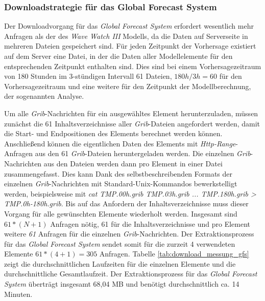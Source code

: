 \subsubsection{Downloadstrategie für das Global Forecast System}
Der Downloadvorgang für das \textit{Global Forecast System} erfordert
wesentlich mehr Anfragen als der des \textit{Wave Watch III} Modells,
da die Daten auf Serverseite in mehreren Dateien gespeichert sind. Für
jeden Zeitpunkt der Vorhersage existiert auf dem Server eine Datei, in
der die Daten aller Modellelemente für den entsprechenden Zeitpunkt
enthalten sind. Dies sind bei einem Vorhersagezeitraum von 180 Stunden
im 3-stündigen Intervall 61 Dateien, $180h / 3h = 60$ für den
Vorhersagezeitraum und eine weitere für den Zeitpunkt der
Modellberechnung, der sogenannten Analyse.

Um alle \textit{Grib}-Nachrichten für ein ausgewähltes Element
herunterzuladen, müssen zunächst die 61 Inhaltsverzeichnisse aller
\textit{Grib}-Dateien angefordert werden, damit die Start- und
Endpositionen des Elements berechnet werden können. Anschließend
können die eigentlichen Daten des Elements mit
\textit{Http-Range}-Anfragen aus den 61 \textit{Grib}-Dateien
heruntergeladen werden. Die einzelnen \textit{Grib}-Nachrichten aus
den Dateien werden dann pro Element in einer Datei
zusammengefasst. Dies kann Dank des selbstbeschreibenden Formats der
einzelnen \textit{Grib}-Nachrichten mit Standard-Unix-Kommandos
bewerkstelligt werden, beispielsweise mit \textit{cat TMP.00h.grib
  TMP.03h.grib ... TMP.180h.grib > TMP.0h-180h.grib}. Bis auf das
Anfordern der Inhaltsverzeichnisse muss dieser Vorgang für alle
gewünschten Elemente wiederholt werden. Insgesamt sind $ 61 * (N+1) $
Anfragen nötig, 61 für die Inhaltsverzeichnisse und pro Element
weitere \textit{61} Anfragen für die einzelnen
\textit{Grib}-Nachrichten. Der Extraktionsprozess für das
\textit{Global Forecast System} sendet somit für die zurzeit 4
verwendeten Elemente $ 61 * (4+1) = 305$ Anfragen. Tabelle
\ref{tab:download_messung_gfs} zeigt die durchschnittlichen Laufzeiten
für die einzelnen Elemente und die durchschnittliche
Gesamtlaufzeit. Der Extraktionsprozess für das \textit{Global Forecast
  System} überträgt insgesamt 68,04 MB und benötigt durchschnittlich
ca. 14 Minuten.

